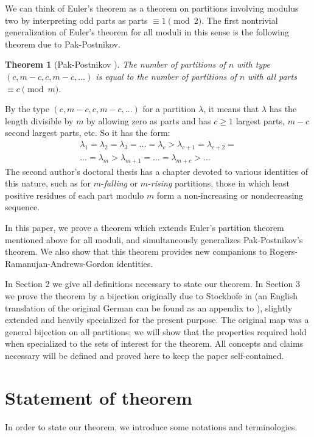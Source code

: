 \documentclass[11pt]{article}
\newtheorem{theorem}{Theorem}[section]
\begin{document}
We can think of Euler's theorem as a theorem on partitions involving modulus two by interpreting odd parts as parts $\equiv 1\pmod 2.$  The first nontrivial generalization of Euler's theorem for all moduli in this sense is the following theorem due to Pak-Postnikov.

 \begin{theorem}[Pak-Postnikov \cite{Pak-Postnikov}]   \label{puretype thm} 
 The number of partitions of $n$ with type $(c, m-c, c, m-c,\dots)$  is equal to the number of partitions of $n$ with all parts $\equiv c \pmod m$.
 \end{theorem}
By the type $(c, m-c,c,m-c,\dots)$ for a partition $\lambda$, it means that $\lambda$ has the length divisible by $m$ by allowing zero as parts  and has $c\geq 1$ largest parts, $m-c$ second largest parts, etc. So it has the form:
\begin{gather*}
\lambda_{1}=\lambda_{2}=\lambda_{3}=\dots=\lambda_{c}>\lambda_{c+1}=\lambda_{c+2}=\\
 \dots = \lambda_{m}>\lambda_{m+1}=\dots=\lambda_{m+c}>\dots
\end{gather*}
The second author's doctoral thesis \cite{KeithThesis} has a chapter devoted to various identities of this nature, such as for $m$-\emph{falling} or $m$-\emph{rising} partitions, those in which least positive residues of each part modulo $m$ form a non-increasing or nondecreasing sequence.

In this paper, we prove a theorem which extends Euler's partition theorem mentioned above for all moduli, and simultaneously generalizes Pak-Postnikov's theorem. We also show that this theorem provides new companions to Rogers-Ramanujan-Andrews-Gordon identities. 
 
In Section 2 we give all definitions necessary to state our theorem.  In Section 3 we prove the theorem by a bijection originally due to Stockhofe in \cite{Stockhofe} (an English translation of the original German can be found as an appendix to \cite{KeithThesis}), slightly extended and heavily specialized for the present purpose.  The original map was a general bijection on all partitions; we will show that the properties required hold when specialized to the sets of interest for the theorem.  All concepts and claims necessary will be defined and proved here to keep the paper self-contained. 


\section{Statement of theorem}
In order to state our theorem, we introduce some notations and terminologies.
\end{document}
